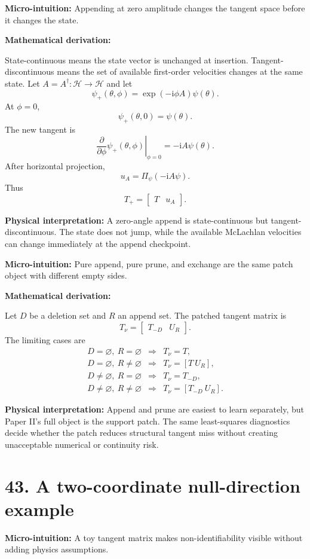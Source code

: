 \documentclass[10pt,twocolumn]{article}
\newcommand{\ii}{\mathrm{i}}
\newcommand{\Hh}{\mathcal H}
\newcommand{\micro}[1]{%
  \par\smallskip
  \noindent\textcolor{deepblue}{\textbf{Micro-intuition:}} #1
  \par\smallskip}
\newcommand{\deriv}{%
  \par\noindent\textcolor{deepviolet}{\textbf{Mathematical derivation:}}\par\vspace{-1mm}}
\newcommand{\phys}[1]{%
  \par\smallskip
  \noindent\textcolor{deepgreen}{\textbf{Physical interpretation:}} #1
  \par\smallskip}
\begin{document}
\micro{Appending at zero amplitude changes the tangent space before it changes
the state.}

\deriv
State-continuous means the state vector is unchanged at insertion.
Tangent-discontinuous means the set of available first-order velocities changes
at the same state. Let \(A=A^\dagger:\Hh\to\Hh\) and let
\[
\psi_+(\theta,\phi)
=
\exp(-\ii\phi A)\psi(\theta).
\]
At \(\phi=0\),
\[
\psi_+(\theta,0)=\psi(\theta).
\]
The new tangent is
\[
\left.\frac{\partial}{\partial\phi}\psi_+(\theta,\phi)\right|_{\phi=0}
=
-\ii A\psi(\theta).
\]
After horizontal projection,
\[
u_A
=
\Pi_\psi(-\ii A\psi).
\]
Thus
\[
T_+
=
\begin{bmatrix}
T&u_A
\end{bmatrix}.
\]

\phys{A zero-angle append is state-continuous but tangent-discontinuous. The
state does not jump, while the available McLachlan velocities can change
immediately at the append checkpoint.}

\micro{Pure append, pure prune, and exchange are the same patch object with
different empty sides.}

\deriv
Let \(D\) be a deletion set and \(R\) an append set. The patched tangent matrix
is
\[
T_\nu
=
\begin{bmatrix}
T_{-D}&U_R
\end{bmatrix}.
\]
The limiting cases are
\[
\begin{array}{ccl}
D=\varnothing,\ R=\varnothing &\Longrightarrow& T_\nu=T,\\[1mm]
D=\varnothing,\ R\ne\varnothing &\Longrightarrow& T_\nu=[T~U_R],\\[1mm]
D\ne\varnothing,\ R=\varnothing &\Longrightarrow& T_\nu=T_{-D},\\[1mm]
D\ne\varnothing,\ R\ne\varnothing &\Longrightarrow& T_\nu=[T_{-D}~U_R].
\end{array}
\]

\phys{Append and prune are easiest to learn separately, but Paper II's full
object is the support patch. The same least-squares diagnostics decide whether
the patch reduces structural tangent miss without creating unacceptable numerical
or continuity risk.}

\section*{43. A two-coordinate null-direction example}

\micro{A toy tangent matrix makes non-identifiability visible without adding
physics assumptions.}
\end{document}
